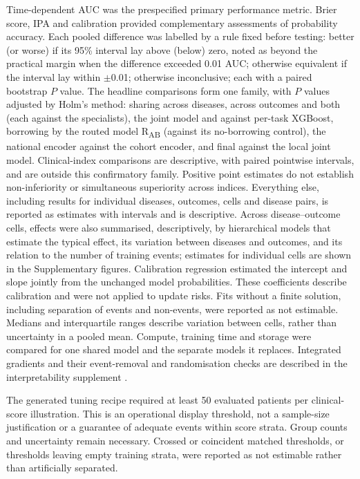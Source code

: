Time-dependent AUC was the prespecified primary performance metric. Brier score,
IPA and calibration provided complementary assessments of probability accuracy.
Each pooled difference was labelled by a rule fixed before testing: better (or
worse) if its 95\% interval lay above (below) zero, noted as beyond the practical
margin when the difference exceeded 0.01 AUC; otherwise equivalent if the
interval lay within $\pm$0.01; otherwise inconclusive; each with a paired
bootstrap $P$ value. The headline comparisons form one family, with $P$ values
adjusted by Holm's method: sharing across diseases, across outcomes and both
(each against the specialists), the joint model and \opera{} against per-task
XGBoost, borrowing by the routed model R\textsubscript{AB} (against its
no-borrowing control), the national encoder against the cohort
encoder, and final \opera{} against the local joint model. Clinical-index
comparisons are descriptive, with paired pointwise intervals, and are outside
this confirmatory family. Positive point estimates do not establish
non-inferiority or simultaneous superiority across indices. Everything else, including
results for individual diseases, outcomes, cells and disease pairs, is reported
as estimates with intervals and is descriptive. Across disease--outcome cells, effects were also summarised,
descriptively, by hierarchical models that estimate the typical effect, its variation between diseases and outcomes,
and its relation to the number of training events; estimates for individual
cells are shown in the Supplementary figures.
Calibration regression estimated the intercept and slope jointly from the
unchanged model probabilities. These coefficients describe calibration and
were not applied to update risks. Fits without a finite solution, including
separation of events and non-events, were reported as not estimable.
Medians and interquartile ranges describe variation between cells, rather than
uncertainty in a pooled mean. Compute, training time and storage were compared
for one shared model and the separate models it replaces. Integrated gradients
and their event-removal and randomisation checks are described in the
interpretability supplement \citep{sundararajan2017ig,adebayo2018sanity}.

The generated tuning recipe required at least 50 evaluated patients per
clinical-score illustration. This is an operational display threshold, not a
sample-size justification or a guarantee of adequate events within score
strata. Group counts and uncertainty remain necessary. Crossed or coincident
matched thresholds, or thresholds leaving empty training strata, were reported
as not estimable rather than artificially separated.

